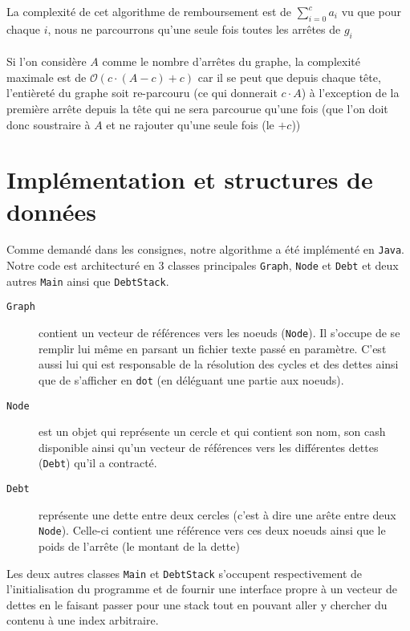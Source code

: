 \documentclass[12pt, oneside]{article}
\begin{document}
La complexité de cet algorithme de remboursement est de $\sum_{i=0}^{c}a_{i}$ vu que pour chaque $i$, nous ne parcourrons qu'une seule fois toutes les arrêtes de $g_{i}$

\paragraph{}
Si l'on considère $A$ comme le nombre d'arrêtes du graphe, la complexité maximale est de $ \mathcal{O}(c\cdot(A-c)+c)$ car il se peut que depuis chaque tête, l'entièreté du graphe soit re-parcouru (ce qui donnerait $c\cdot A$) à l'exception de la première arrête depuis la tête qui ne sera parcourue qu'une fois (que l'on doit donc soustraire à $A$ et ne rajouter qu'une seule fois (le $+c$))

\section{Implémentation et structures de données}
Comme demandé dans les consignes, notre algorithme a été implémenté en \texttt{Java}. Notre code est architecturé en 3 classes principales \texttt{Graph}, \texttt{Node} et \texttt{Debt} et deux autres \texttt{Main} ainsi que \texttt{DebtStack}.

\begin{description}
\item[\texttt{Graph}] contient un vecteur de références vers les noeuds (\texttt{Node}). Il s'occupe de se remplir lui même en parsant un fichier texte passé en paramètre. C'est aussi lui qui est responsable de la résolution des cycles et des dettes ainsi que de s'afficher en \texttt{dot} (en déléguant une partie aux noeuds).
\item[\texttt{Node}] est un objet qui représente un cercle et qui contient son nom, son cash disponible ainsi qu'un vecteur de références vers les différentes dettes 
(\texttt{Debt}) qu'il a contracté.
\item[\texttt{Debt}] représente une dette entre deux cercles (c'est à dire une arête entre deux \texttt{Node}). Celle-ci contient une référence vers ces deux noeuds ainsi que le poids de l'arrête (le montant de la dette)
\end{description}
Les deux autres classes \texttt{Main} et \texttt{DebtStack} s'occupent respectivement de l'initialisation du programme et de fournir une interface propre à un vecteur de dettes en le faisant passer pour une stack tout en pouvant aller y chercher du contenu à une index arbitraire.
\end{document}
